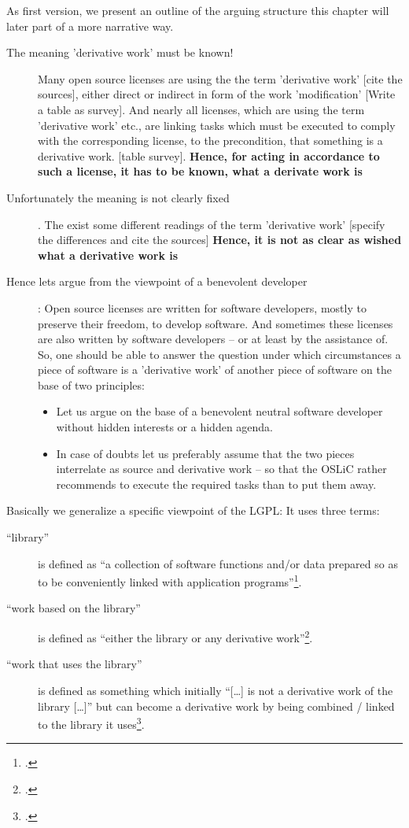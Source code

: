 As first version, we present an outline of the arguing structure this chapter
will later part of a more narrative way.

\begin{description}
  \item[The meaning 'derivative work' must be known!] Many open source licenses
  are using the the term 'derivative work'  [cite the sources], either direct or
  indirect in form of the work 'modification' [Write a table as survey]. And
  nearly all licenses, which are using the term 'derivative work' etc., are
  linking tasks which must be executed to comply with the corresponding license,
  to the precondition, that something is a derivative work.
  [table survey]. \textbf{Hence, for acting in accordance to such a license, it
  has to be known, what a derivate work is}
  \item[Unfortunately the meaning is not clearly fixed]. The exist some
  different readings of the term 'derivative work' [specify the differences and
  cite the sources] \textbf{Hence, it is not as clear as wished what a derivative
  work is}
  \item[Hence lets argue from the viewpoint of a benevolent developer]: Open
  source licenses are written for software developers, mostly to preserve their
  freedom, to develop software. And sometimes these licenses are also written by
  software developers -- or at least by the assistance of. So, one should be
  able to answer the question under which circumstances a piece of software is a
  'derivative work' of another piece of software on the base of two principles:
  \begin{itemize}
  \item Let us argue on the base of a benevolent neutral software developer
  without hidden interests or a hidden agenda.
  \item In case of doubts let us preferably assume that the two pieces
  interrelate as source and derivative work -- so that the OSLiC rather recommends
  to execute the required tasks than to put them away.
\end{itemize}
\end{description}

Basically we generalize a specific viewpoint of the LGPL: It uses three terms:

\begin{description}
  \item[\enquote{library}] is defined as \enquote{a collection of software
  functions and/or data prepared so as to be conveniently linked with
  application programs}\footcite[cf.][\nopage wp §0]{Lgpl21OsiLicense1999a}.
  \item[\enquote{work based on the library}] is defined as \enquote{either the
  library or any derivative work}\footcite[cf.][\nopage wp
  §0]{Lgpl21OsiLicense1999a}.
  \item[\enquote{work that uses the library}] is defined as something which
  initially \enquote{[\ldots] is not a derivative work of the library [\ldots]}
  but can become a derivative work by being combined / linked to the library it
  uses\footcite[cf.][\nopage wp §5]{Lgpl21OsiLicense1999a}.
\end{description}

